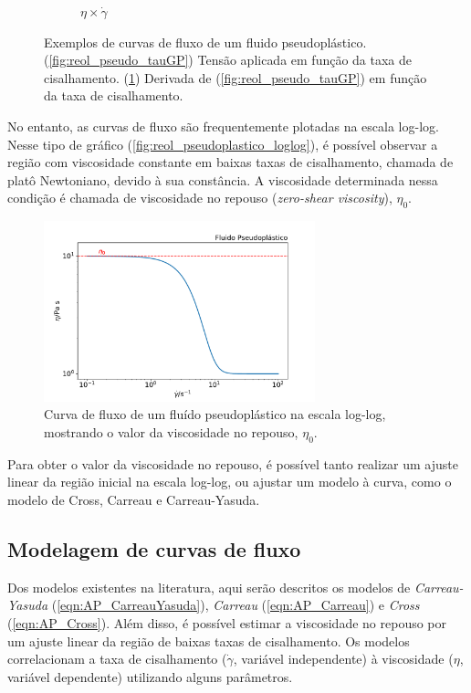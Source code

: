 \begin{figure}[h]
\begin{subfigure}[t]{.5\textwidth}
					\caption{\(\eta \times \dot{\gamma}\)}
					\label{fig:reol_pseudo_etaGP}
				\end{subfigure}
				\caption{Exemplos de curvas de fluxo de um fluido pseudoplástico. (\ref{fig:reol_pseudo_tauGP}) Tensão aplicada em função da taxa de cisalhamento. (\ref{fig:reol_pseudo_etaGP}) Derivada de (\ref{fig:reol_pseudo_tauGP}) em função da taxa de cisalhamento.}
				\label{fig:reol_pseudoplastico_exemplos}
			\end{figure} 
			
			No entanto, as curvas de fluxo são frequentemente plotadas na escala log-log. Nesse tipo de gráfico (\autoref{fig:reol_pseudoplastico_loglog}), é possível observar a região com viscosidade constante em baixas taxas de cisalhamento, chamada de platô Newtoniano, devido à sua constância. A viscosidade determinada nessa condição é chamada de viscosidade no repouso (\emph{zero-shear viscosity}), \(\eta_0\).\cite{Kronberg2014a}
			
			\begin{figure}[h]
				\centering
				\includegraphics[width=0.7\textwidth]{./imagens/reologia/Pseudoplastico_loglog}
				\caption{Curva de fluxo de um fluído pseudoplástico na escala log-log, mostrando o valor da viscosidade no repouso, \(\eta_0\).}
				\label{fig:reol_pseudoplastico_loglog}
			\end{figure}
		
			Para obter o valor da viscosidade no repouso, é possível tanto realizar um ajuste linear da região inicial na escala log-log, ou ajustar um modelo à curva, como o modelo de Cross, Carreau e Carreau-Yasuda.
			
			\subsection{Modelagem de curvas de fluxo}
			\label{sec:modelagem_curva_fluxo}
			Dos modelos existentes na literatura, aqui serão descritos os modelos de \emph{Carreau-Yasuda} (\ref{eqn:AP_CarreauYasuda})\cite{Kwiatkowski2016a}, \emph{Carreau} (\autoref{eqn:AP_Carreau})\cite{Boger1989} e \emph{Cross} (\autoref{eqn:AP_Cross})\cite{Boger1989}. Além disso, é possível estimar a viscosidade no repouso por um ajuste linear da região de baixas taxas de cisalhamento. Os modelos correlacionam a taxa de cisalhamento (\(\dot{\gamma}\), variável independente) à viscosidade (\(\eta\), variável dependente) utilizando alguns parâmetros.
			

